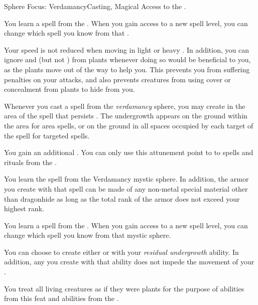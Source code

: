     \begin{feat}{Sphere Focus: Verdamancy}{Casting, Magical}
        \featpre Access to the  .

         You learn a spell from the  .
        When you gain access to a new spell level, you can change which spell you know from that .

         Your speed is not reduced when moving in light or heavy .
        In addition, you can ignore  and  (but not ) from plants whenever doing so would be beneficial to you, as the plants move out of the way to help you.
        This prevents you from suffering penalties on your attacks, and also prevents creatures from using cover or concealment from plants to hide from you.

         Whenever you cast a spell from the \textit{verdamancy} sphere, you may create  in the area of the spell that persists .
        The undergrowth appears on the ground within the area for area spells, or on the ground in all spaces occupied by each target of the spell for targeted spells.

         You gain an additional .
        You can only use this attunement point to  to spells and rituals from the  .

         You learn the  spell from the Verdamancy mystic sphere.
        In addition, the armor you create with that spell can be made of any non-metal special material other than dragonhide as long as the total rank of the armor does not exceed your highest rank.

         You learn a spell from the  .
        When you gain access to a new spell level, you can change which spell you know from that mystic sphere.

         You can choose to create either  or  with your \textit{residual undergrowth} ability.
        In addition, any  you create with that ability does not impede the movement of your .

         You treat all living creatures as if they were plants for the purpose of abilities from this feat and abilities from the  .
    \end{feat}


